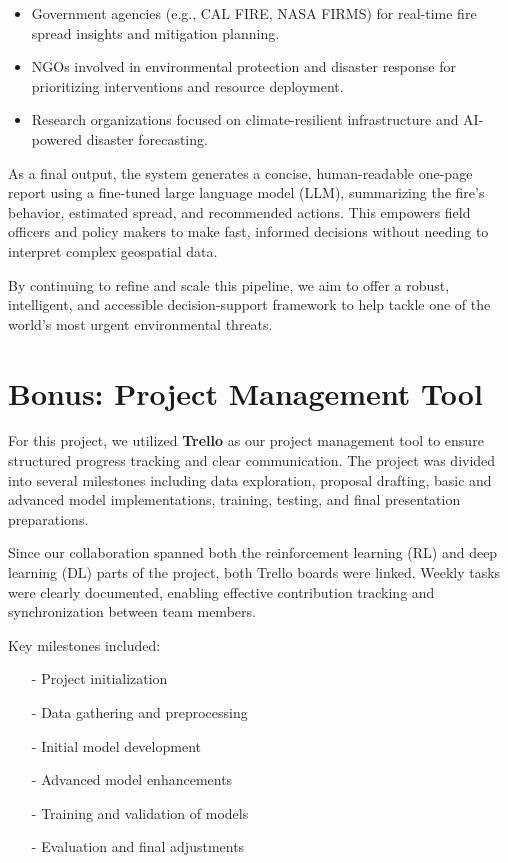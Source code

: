 \documentclass[conference]{IEEEtran}
\begin{document}
\begin{itemize}
\item Government agencies (e.g., CAL FIRE, NASA FIRMS) for real-time fire spread insights and mitigation planning.
\item NGOs involved in environmental protection and disaster response for prioritizing interventions and resource deployment.
\item Research organizations focused on climate-resilient infrastructure and AI-powered disaster forecasting.
\end{itemize}

\noindent
As a final output, the system generates a concise, human-readable one-page report using a fine-tuned large language model (LLM), summarizing the fire's behavior, estimated spread, and recommended actions. This empowers field officers and policy makers to make fast, informed decisions without needing to interpret complex geospatial data.

\noindent
By continuing to refine and scale this pipeline, we aim to offer a robust, intelligent, and accessible decision-support framework to help tackle one of the world's most urgent environmental threats.

\section{Bonus: Project Management Tool}
For this project, we utilized \textbf{Trello} as our project management tool to ensure structured progress tracking and clear communication. The project was divided into several milestones including data exploration, proposal drafting, basic and advanced model implementations, training, testing, and final presentation preparations.

Since our collaboration spanned both the reinforcement learning (RL) and deep learning (DL) parts of the project, both Trello boards were linked. Weekly tasks were clearly documented, enabling effective contribution tracking and synchronization between team members.

Key milestones included:

\begin{enumerate}
\item[-] Project initialization
\item[-] Data gathering and preprocessing
\item[-] Initial model development
\item[-] Advanced model enhancements
\item[-] Training and validation of models
\item[-] Evaluation and final adjustments
\end{enumerate}
\end{document}
